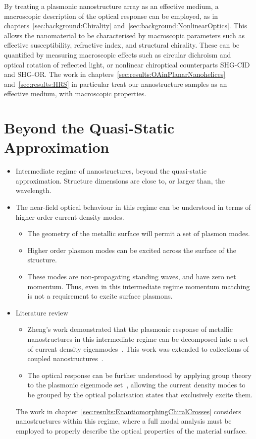 By treating a plasmonic nanostructure array as an effective medium, a macroscopic description of the optical response can be employed, as in chapters~\ref{sec:background:Chirality} and~\ref{sec:background:NonlinearOptics}. This allows the nanomaterial to be characterised by macroscopic parameters such as effective susceptibility, refractive index, and structural chirality. These can be quantified by measuring macroscopic effects such as circular dichroism and optical rotation of reflected light, or nonlinear chiroptical counterparts SHG-CID and SHG-OR. The work in chapters~\ref{sec:results:OAinPlanarNanohelices} and~\ref{sec:results:HRS} in particular treat our nanostructure samples as an effective medium, with macroscopic properties.

\section{Beyond the Quasi-Static Approximation}
\begin{itemize}
    \item Intermediate regime of nanostructures, beyond the quasi-static approximation. Structure dimensions are close to, or larger than, the wavelength.
    \item The near-field optical behaviour in this regime can be understood in terms of higher order current density modes.
    \begin{itemize}
        \item The geometry of the metallic surface will permit a set of plasmon modes.
        \item Higher order plasmon modes can be excited across the surface of the structure.
        \item These modes are non-propagating standing waves, and have zero net momentum. Thus, even in this intermediate regime momentum matching is not a requirement to excite surface plasmons.
    \end{itemize}
    \item Literature review
    \begin{itemize}
        \item Zheng's work demonstrated that the plasmonic response of metallic nanostructures in this intermediate regime can be decomposed into a set of current density eigenmodes~\cite{Zheng2012}. This work was extended to collections of coupled nanostructures~\cite{Zheng2013}. 
        \item The optical response can be further understood by applying group theory to the plasmonic eigenmode set~\cite{Zheng2015}, allowing the current density modes to be grouped by the optical polarisation states that exclusively excite them.
    \end{itemize}

    The work in chapter~\ref{sec:results:EnantiomorphingChiralCrosses} considers nanostructures within this regime, where a full modal analysis must be employed to properly describe the optical properties of the material surface.
\end{itemize}


